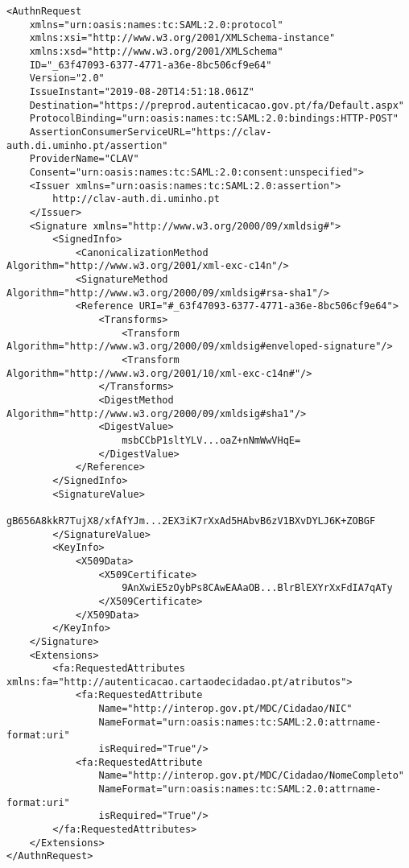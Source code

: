\begin{lstlisting}
<AuthnRequest 
    xmlns="urn:oasis:names:tc:SAML:2.0:protocol"
    xmlns:xsi="http://www.w3.org/2001/XMLSchema-instance"
    xmlns:xsd="http://www.w3.org/2001/XMLSchema"
    ID="_63f47093-6377-4771-a36e-8bc506cf9e64"
    Version="2.0"
    IssueInstant="2019-08-20T14:51:18.061Z"
    Destination="https://preprod.autenticacao.gov.pt/fa/Default.aspx"
    ProtocolBinding="urn:oasis:names:tc:SAML:2.0:bindings:HTTP-POST"
    AssertionConsumerServiceURL="https://clav-auth.di.uminho.pt/assertion"
    ProviderName="CLAV" 
    Consent="urn:oasis:names:tc:SAML:2.0:consent:unspecified">
    <Issuer xmlns="urn:oasis:names:tc:SAML:2.0:assertion">
        http://clav-auth.di.uminho.pt
    </Issuer>
    <Signature xmlns="http://www.w3.org/2000/09/xmldsig#">
        <SignedInfo>
            <CanonicalizationMethod Algorithm="http://www.w3.org/2001/xml-exc-c14n"/>
            <SignatureMethod Algorithm="http://www.w3.org/2000/09/xmldsig#rsa-sha1"/>
            <Reference URI="#_63f47093-6377-4771-a36e-8bc506cf9e64">
                <Transforms>
                    <Transform Algorithm="http://www.w3.org/2000/09/xmldsig#enveloped-signature"/>
                    <Transform Algorithm="http://www.w3.org/2001/10/xml-exc-c14n#"/>
                </Transforms>
                <DigestMethod Algorithm="http://www.w3.org/2000/09/xmldsig#sha1"/>
                <DigestValue>
                    msbCCbP1sltYLV...oaZ+nNmWwVHqE=
                </DigestValue>
            </Reference>
        </SignedInfo>
        <SignatureValue>
            gB656A8kkR7TujX8/xfAfYJm...2EX3iK7rXxAd5HAbvB6zV1BXvDYLJ6K+ZOBGF
        </SignatureValue>
        <KeyInfo>
            <X509Data>
                <X509Certificate>
                    9AnXwiE5zOybPs8CAwEAAaOB...BlrBlEXYrXxFdIA7qATy
                </X509Certificate>
            </X509Data>
        </KeyInfo>
    </Signature>
    <Extensions>
        <fa:RequestedAttributes xmlns:fa="http://autenticacao.cartaodecidadao.pt/atributos">
            <fa:RequestedAttribute 
                Name="http://interop.gov.pt/MDC/Cidadao/NIC" 
                NameFormat="urn:oasis:names:tc:SAML:2.0:attrname-format:uri" 
                isRequired="True"/>
            <fa:RequestedAttribute
                Name="http://interop.gov.pt/MDC/Cidadao/NomeCompleto" 
                NameFormat="urn:oasis:names:tc:SAML:2.0:attrname-format:uri" 
                isRequired="True"/>
        </fa:RequestedAttributes>
    </Extensions>
</AuthnRequest>
\end{lstlisting}

